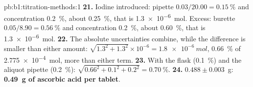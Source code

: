 \begin{solution}{pb:b1:titration-methods:1}
\textbf{21.} Iodine introduced: pipette $0.03/20.00 = \qty{0.15}{\percent}$
and concentration \qty{0.2}{\percent}, about \qty{0.25}{\percent}, that is
\qty{1.3e-6}{mol}. Excess: burette $0.05/8.90 = \qty{0.56}{\percent}$ and
concentration \qty{0.2}{\percent}, about \qty{0.60}{\percent}, that is
\qty{1.3e-6}{mol}.
\textbf{22.} The absolute uncertainties combine, while the difference is
smaller than either amount: $\sqrt{1.3^2 + 1.3^2} \times 10^{-6} =
\qty{1.8e-6}{mol}$, \qty{0.66}{\percent} of \qty{2.775e-4}{mol}, more than
either term.
\textbf{23.} With the flask (\qty{0.1}{\percent}) and the aliquot pipette
(\qty{0.2}{\percent}): $\sqrt{0.66^2 + 0.1^2 + 0.2^2} = \qty{0.70}{\percent}$.
\textbf{24.} $0.488 \pm 0.003$~g: \textbf{\qty{0.49}{g} of ascorbic acid
per tablet}.
\end{solution}
